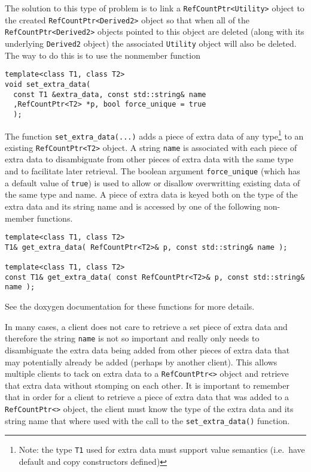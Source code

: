The solution to this type of problem is to link a
{}\texttt{RefCountPtr<Utility>} object to the created
{}\texttt{RefCountPtr<Derived2>} object so that when all of the
{}\texttt{RefCountPtr<Derived2>} objects pointed to this object are
deleted (along with its underlying {}\texttt{Derived2} object) the
associated {}\texttt{Utility} object will also be deleted.  The way to
do this is to use the nonmember function
%
{\scriptsize\begin{verbatim}
template<class T1, class T2>
void set_extra_data(
  const T1 &extra_data, const std::string& name
  ,RefCountPtr<T2> *p, bool force_unique = true
  );
\end{verbatim}}
%
The function {}\texttt{set\-\_extra\-\_data(...)} adds a piece of
extra data of any type\footnote{Note: the type {}\texttt{T1} used for
extra data must support value semantics (i.e.~have default and copy
constructors defined)} to an existing {}\texttt{RefCountPtr<T2>}
object.  A string \texttt{name} is associated with each piece of extra
data to disambiguate from other pieces of extra data with the same
type and to facilitate later retrieval.  The boolean argument
\texttt{force\-\_unique} (which has a default value of \texttt{true})
is used to allow or disallow overwritting existing data of the same
type and name.  A piece of extra data is keyed both on the type of the
extra data and its string name and is accessed by one of the following
non-member functions.
%
{\scriptsize\begin{verbatim}
template<class T1, class T2>
T1& get_extra_data( RefCountPtr<T2>& p, const std::string& name );

template<class T1, class T2>
const T1& get_extra_data( const RefCountPtr<T2>& p, const std::string& name );
\end{verbatim}}
%
\noindent{}
See the doxygen documentation for these functions
for more details.

In many cases, a client does not care to retrieve a set piece of extra
data and therefore the string \texttt{name} is not so important and
really only needs to disambiguate the extra data being added from
other pieces of extra data that may potentially already be added
(perhaps by another client).  This allows multiple clients to tack on
extra data to a {}\texttt{RefCountPtr<>} object and retrieve that
extra data without stomping on each other.  It is important to
remember that in order for a client to retrieve a piece of extra data
that was added to a {}\texttt{RefCountPtr<>} object, the client must
know the type of the extra data and its string name that where used
with the call to the {}\texttt{set\-\_extra\-\_data()} function.

